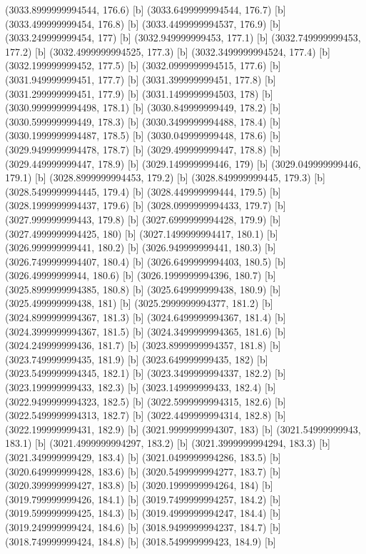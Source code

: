 {{{(3033.8999999994544, 176.6) [b] 
(3033.6499999994544, 176.7) [b] 
(3033.499999999454, 176.8) [b] 
(3033.4499999994537, 176.9) [b] 
(3033.249999999454, 177) [b] 
(3032.949999999453, 177.1) [b] 
(3032.749999999453, 177.2) [b] 
(3032.4999999994525, 177.3) [b] 
(3032.3499999994524, 177.4) [b] 
(3032.199999999452, 177.5) [b] 
(3032.0999999994515, 177.6) [b] 
(3031.949999999451, 177.7) [b] 
(3031.399999999451, 177.8) [b] 
(3031.299999999451, 177.9) [b] 
(3031.1499999994503, 178) [b] 
(3030.9999999994498, 178.1) [b] 
(3030.849999999449, 178.2) [b] 
(3030.599999999449, 178.3) [b] 
(3030.3499999994488, 178.4) [b] 
(3030.1999999994487, 178.5) [b] 
(3030.049999999448, 178.6) [b] 
(3029.9499999994478, 178.7) [b] 
(3029.499999999447, 178.8) [b] 
(3029.449999999447, 178.9) [b] 
(3029.149999999446, 179) [b] 
(3029.049999999446, 179.1) [b] 
(3028.8999999994453, 179.2) [b] 
(3028.849999999445, 179.3) [b] 
(3028.5499999994445, 179.4) [b] 
(3028.449999999444, 179.5) [b] 
(3028.1999999994437, 179.6) [b] 
(3028.0999999994433, 179.7) [b] 
(3027.999999999443, 179.8) [b] 
(3027.6999999994428, 179.9) [b] 
(3027.4999999994425, 180) [b] 
(3027.1499999994417, 180.1) [b] 
(3026.999999999441, 180.2) [b] 
(3026.949999999441, 180.3) [b] 
(3026.7499999994407, 180.4) [b] 
(3026.6499999994403, 180.5) [b] 
(3026.49999999944, 180.6) [b] 
(3026.1999999994396, 180.7) [b] 
(3025.8999999994385, 180.8) [b] 
(3025.649999999438, 180.9) [b] 
(3025.499999999438, 181) [b] 
(3025.2999999994377, 181.2) [b] 
(3024.8999999994367, 181.3) [b] 
(3024.6499999994367, 181.4) [b] 
(3024.3999999994367, 181.5) [b] 
(3024.3499999994365, 181.6) [b] 
(3024.249999999436, 181.7) [b] 
(3023.8999999994357, 181.8) [b] 
(3023.749999999435, 181.9) [b] 
(3023.649999999435, 182) [b] 
(3023.5499999994345, 182.1) [b] 
(3023.3499999994337, 182.2) [b] 
(3023.199999999433, 182.3) [b] 
(3023.149999999433, 182.4) [b] 
(3022.9499999994323, 182.5) [b] 
(3022.5999999994315, 182.6) [b] 
(3022.5499999994313, 182.7) [b] 
(3022.4499999994314, 182.8) [b] 
(3022.199999999431, 182.9) [b] 
(3021.9999999994307, 183) [b] 
(3021.54999999943, 183.1) [b] 
(3021.4999999994297, 183.2) [b] 
(3021.3999999994294, 183.3) [b] 
(3021.349999999429, 183.4) [b] 
(3021.0499999994286, 183.5) [b] 
(3020.649999999428, 183.6) [b] 
(3020.5499999994277, 183.7) [b] 
(3020.399999999427, 183.8) [b] 
(3020.1999999994264, 184) [b] 
(3019.799999999426, 184.1) [b] 
(3019.7499999994257, 184.2) [b] 
(3019.599999999425, 184.3) [b] 
(3019.4999999994247, 184.4) [b] 
(3019.249999999424, 184.6) [b] 
(3018.9499999994237, 184.7) [b] 
(3018.749999999424, 184.8) [b] 
(3018.549999999423, 184.9) [b] 
}}}
